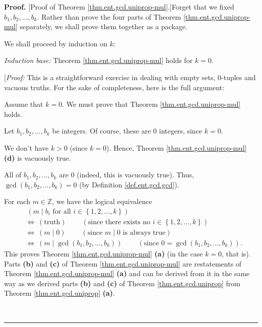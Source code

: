 \documentclass[numbers=enddot,12pt,final,onecolumn,notitlepage]{scrartcl}%
\newcounter{exer}
\numberwithin{exer}{subsection}
\theoremstyle{definition}
\newenvironment{fineprint}{\begin{small}}{\end{small}}
\newenvironment{proof}[1][Proof]{\noindent\textbf{#1.} }{\ \rule{0.5em}{0.5em}}
\begin{document}
\begin{proof}
[Proof of Theorem \ref{thm.ent.gcd.uniprop-mul}.]Forget that we fixed
$b_{1},b_{2},\ldots,b_{k}$. Rather than prove the four parts of Theorem
\ref{thm.ent.gcd.uniprop-mul} separately, we shall prove them together as a package.

We shall proceed by induction on $k$:

\textit{Induction base:} Theorem \ref{thm.ent.gcd.uniprop-mul} holds for $k=0$.

\begin{fineprint}
[\textit{Proof:} This is a straightforward exercise in dealing with empty
sets, $0$-tuples and vacuous truths. For the sake of completeness, here is the
full argument:

Assume that $k=0$. We must prove that Theorem \ref{thm.ent.gcd.uniprop-mul} holds.

Let $b_{1},b_{2},\ldots,b_{k}$ be integers. Of course, these are $0$ integers,
since $k=0$.

We don't have $k>0$ (since $k=0$). Hence, Theorem
\ref{thm.ent.gcd.uniprop-mul} \textbf{(d)} is vacuously true.

All of $b_{1},b_{2},\ldots,b_{k}$ are $0$ (indeed, this is vacuously true).
Thus, $\gcd\left(  b_{1},b_{2},\ldots,b_{k}\right)  =0$ (by Definition
\ref{def.ent.gcd.gcd}).

For each $m\in\mathbb{Z}$, we have the logical equivalence%
\begin{align*}
&  \ \left(  m\mid b_{i}\text{ for all }i\in\left\{  1,2,\ldots,k\right\}
\right) \\
&  \Longleftrightarrow\ \left(  \text{truth}\right)
\ \ \ \ \ \ \ \ \ \ \left(  \text{since there exists no }i\in\left\{
1,2,\ldots,k\right\}  \right) \\
&  \Longleftrightarrow\ \left(  m\mid0\right)  \ \ \ \ \ \ \ \ \ \ \left(
\text{since }m\mid0\text{ is always true}\right) \\
&  \Longleftrightarrow\ \left(  m\mid\gcd\left(  b_{1},b_{2},\ldots
,b_{k}\right)  \right)  \ \ \ \ \ \ \ \ \ \ \left(  \text{since }0=\gcd\left(
b_{1},b_{2},\ldots,b_{k}\right)  \right)  .
\end{align*}
This proves Theorem \ref{thm.ent.gcd.uniprop-mul} \textbf{(a)} (in the case
$k=0$, that is). Parts \textbf{(b)} and \textbf{(c)} of Theorem
\ref{thm.ent.gcd.uniprop-mul} are restatements of Theorem
\ref{thm.ent.gcd.uniprop-mul} \textbf{(a)} and can be derived from it in the
same way as we derived parts \textbf{(b)} and \textbf{(c)} of Theorem
\ref{thm.ent.gcd.uniprop} from Theorem \ref{thm.ent.gcd.uniprop} \textbf{(a)}.


\end{fineprint}
\end{proof}
\end{document}
